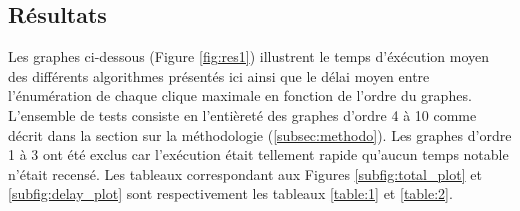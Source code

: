 \documentclass[12pt,a4paper]{article}
\begin{document}
\subsection{Résultats}%
\label{subsec:res}

Les graphes ci-dessous (Figure \ref{fig:res1}) illustrent le temps d'éxécution moyen des différents algorithmes présentés ici ainsi que le délai moyen entre l'énumération de chaque clique maximale en fonction de l'ordre du graphes. L'ensemble de tests consiste en l'entièreté des graphes d'ordre 4 à 10 comme décrit dans la section sur la méthodologie (\ref{subsec:methodo}). Les graphes d'ordre 1 à 3 ont été exclus car l'exécution était tellement rapide qu'aucun temps notable n'était recensé.
Les tableaux correspondant aux Figures \ref{subfig:total_plot} et \ref{subfig:delay_plot} sont respectivement les tableaux \ref{table:1} et \ref{table:2}.
\end{document}
